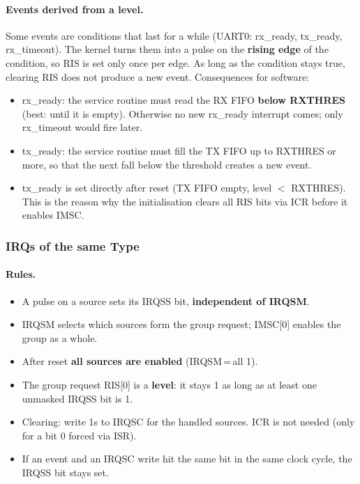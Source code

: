\paragraph{Events derived from a level.}
Some events are conditions that last for a while (UART0: rx\_ready, tx\_ready,
rx\_timeout). The kernel turns them into a pulse on the
\textbf{rising edge} of the condition, so RIS is set only once per edge. As long as
the condition stays true, clearing RIS does not produce a new event. Consequences
for software:
\begin{itemize}
  \item rx\_ready: the service routine must read the RX FIFO \textbf{below RXTHRES}
    (best: until it is empty). Otherwise no new rx\_ready interrupt comes; only
    rx\_timeout would fire later.
  \item tx\_ready: the service routine must fill the TX FIFO up to RXTHRES or more,
    so that the next fall below the threshold creates a new event.
  \item tx\_ready is set directly after reset (TX FIFO empty, level $<$ RXTHRES).
    This is the reason why the initialisation clears all RIS bits via ICR before it
    enables IMSC.
\end{itemize}

\subsubsection{IRQs of the same Type}
\label{subsubsec:archirqflowsame}

\paragraph{Rules.}
\begin{itemize}
  \item A pulse on a source sets its IRQSS bit, \textbf{independent of IRQSM}.
  \item IRQSM selects which sources form the group request; IMSC[0] enables the
    group as a whole.
  \item After reset \textbf{all sources are enabled} (IRQSM\,=\,all 1).
  \item The group request RIS[0] is a \textbf{level}: it stays 1 as long as at
    least one unmasked IRQSS bit is 1.
  \item Clearing: write 1s to IRQSC for the handled sources. ICR is not needed
    (only for a bit 0 forced via ISR).
  \item If an event and an IRQSC write hit the same bit in the same clock cycle,
    the IRQSS bit stays set.
\end{itemize}

